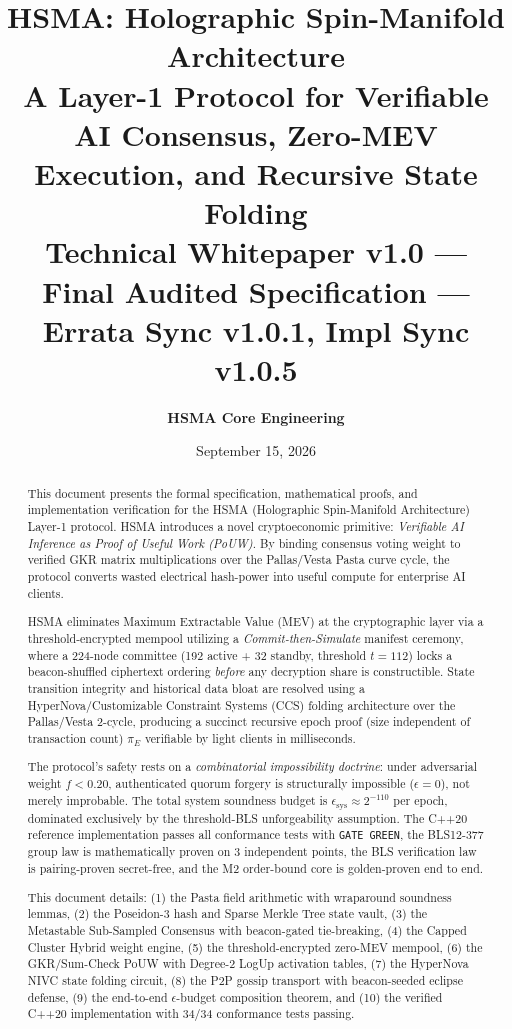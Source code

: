 \documentclass[11pt, a4paper]{article}
\title{\textbf{HSMA: Holographic Spin-Manifold Architecture} \\[0.5em]
\Large A Layer-1 Protocol for Verifiable AI Consensus, Zero-MEV Execution, and Recursive State Folding \\[0.5em]
\large Technical Whitepaper v1.0 --- Final Audited Specification --- Errata Sync v1.0.1, Impl Sync v1.0.5}
\author{\textbf{HSMA Core Engineering}}
\date{September 15, 2026}
\begin{document}
\maketitle

\begin{abstract}
This document presents the formal specification, mathematical proofs, and implementation verification for the HSMA (Holographic Spin-Manifold Architecture) Layer-1 protocol. HSMA introduces a novel cryptoeconomic primitive: \textit{Verifiable AI Inference as Proof of Useful Work (PoUW)}. By binding consensus voting weight to verified GKR matrix multiplications over the Pallas/Vesta Pasta curve cycle, the protocol converts wasted electrical hash-power into useful compute for enterprise AI clients.

HSMA eliminates Maximum Extractable Value (MEV) at the cryptographic layer via a threshold-encrypted mempool utilizing a \textit{Commit-then-Simulate} manifest ceremony, where a 224-node committee (192 active + 32 standby, threshold $t = 112$) locks a beacon-shuffled ciphertext ordering \textit{before} any decryption share is constructible. State transition integrity and historical data bloat are resolved using a HyperNova/Customizable Constraint Systems (CCS) folding architecture over the Pallas/Vesta 2-cycle, producing a succinct recursive epoch proof (size independent of transaction count) $\pi_E$ verifiable by light clients in milliseconds.

The protocol's safety rests on a \textit{combinatorial impossibility doctrine}: under adversarial weight $f < 0.20$, authenticated quorum forgery is structurally impossible ($\epsilon = 0$), not merely improbable. The total system soundness budget is $\epsilon_{\text{sys}} \approx 2^{-110}$ per epoch, dominated exclusively by the threshold-BLS unforgeability assumption. The C++20 reference implementation passes all conformance tests with \texttt{GATE GREEN}, the BLS12-377 group law is mathematically proven on 3 independent points, the BLS verification law is pairing-proven secret-free, and the M2 order-bound core is golden-proven end to end.

This document details: (1) the Pasta field arithmetic with wraparound soundness lemmas, (2) the Poseidon-3 hash and Sparse Merkle Tree state vault, (3) the Metastable Sub-Sampled Consensus with beacon-gated tie-breaking, (4) the Capped Cluster Hybrid weight engine, (5) the threshold-encrypted zero-MEV mempool, (6) the GKR/Sum-Check PoUW with Degree-2 LogUp activation tables, (7) the HyperNova NIVC state folding circuit, (8) the P2P gossip transport with beacon-seeded eclipse defense, (9) the end-to-end $\epsilon$-budget composition theorem, and (10) the verified C++20 implementation with 34/34 conformance tests passing.
\end{abstract}
\end{document}
